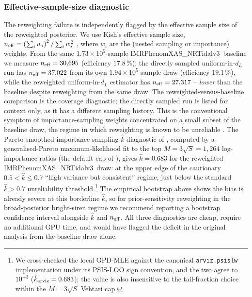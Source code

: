\documentclass[usenatbib]{mnras}
\newcommand{\IMRX}{IMRPhenomXAS\_NRTidalv3\xspace}
\begin{document}
\subsubsection{Effective-sample-size diagnostic} The reweighting failure is independently flagged by the effective sample size of the reweighted posterior. We use Kish's effective sample size, $n_{\rm eff}=\left(\sum_i w_i\right)^2/\sum_i w_i^2$ \citep{Kish1965}, where $w_i$ are the (nested sampling or importance) weights. From the same $1.73\times 10^{5}$-sample \IMRX\ baseline we measure $n_{\rm eff}=30{,}695$ (efficiency $17.8\,\%$); the directly sampled uniform-in-$d_L$ run has $n_{\rm eff}=37{,}022$ from its own $1.94\times 10^{5}$-sample draw (efficiency $19.1\,\%$), while the reweighted uniform-in-$d_L$ estimator has $n_{\rm eff}=27{,}317$ -- \emph{lower} than the baseline despite reweighting from the same draw. The reweighted-versus-baseline comparison is the coverage diagnostic; the directly sampled run is listed for context only, as it has a different sampling history. This is the conventional symptom of importance-sampling weights concentrated on a small subset of the baseline draw, the regime in which reweighting is known to be unreliable \citep{Payne2019Reweighting,Vehtari2024PSIS}. The Pareto-smoothed importance-sampling $\hat{k}$ diagnostic of \citet{Vehtari2024PSIS}, computed by a generalised-Pareto maximum-likelihood fit to the top $M=3\sqrt{S}=1{,}264$ log-importance ratios (the default cap of \citealp{Vehtari2024PSIS}), gives $\hat{k}=0.683$ for the reweighted \IMRX\ draw: at the upper edge of the cautionary $0.5<\hat{k}\le 0.7$ ``high variance but consistent'' regime, just below the standard $\hat{k}>0.7$ unreliability threshold.\footnote{\raggedright We cross-checked the local GPD-MLE against the canonical \texttt{arviz.psislw} implementation under its PSIS-LOO sign convention, and the two agree to $10^{-3}$ ($\hat{k}_{\rm arviz}=0.683$); the value is also insensitive to the tail-fraction choice within the $M=3\sqrt{S}$ Vehtari cap.} The empirical bootstrap above shows the bias is already severe at this borderline $\hat{k}$, so for prior-sensitivity reweighting in the broad-posterior bright-siren regime we recommend reporting a bootstrap confidence interval alongside $\hat{k}$ and $n_{\rm eff}$. All three diagnostics are cheap, require no additional GPU time, and would have flagged the deficit in the original analysis from the baseline draw alone.
\end{document}
